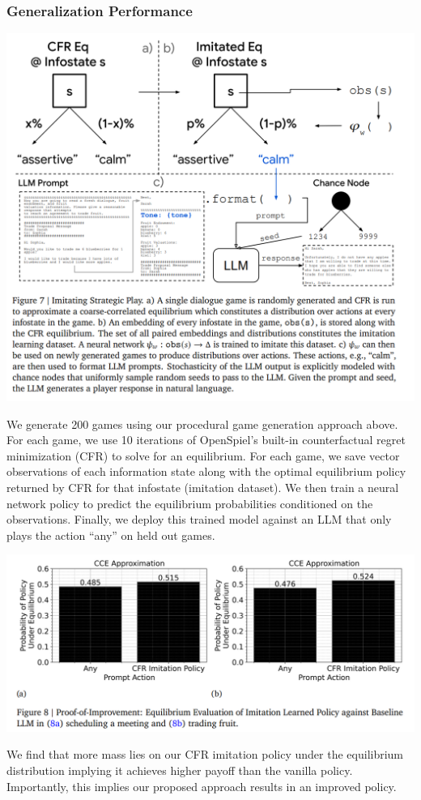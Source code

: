 \documentclass[12pt]{article}
\begin{document}
\subsubsection*{Generalization Performance}
\begin{center}
  \includegraphics*[scale = 0.5]{fig13.png}
\end{center}
We generate 200 games using our procedural game generation approach above. For each game, we use 10 iterations of OpenSpiel's built-in counterfactual
regret minimization (CFR) to solve for an equilibrium.  For each game, we save vector observations of each information state along with the optimal equilibrium policy returned by CFR for that infostate (imitation dataset). We then train a neural network policy to predict the equilibrium probabilities conditioned on the
observations. Finally, we deploy this trained
model against an LLM that only plays the action ``any'' on held out games.
\begin{center}
  \includegraphics*[scale = 0.5]{fig14.png}
\end{center}
We find that more mass lies on our CFR imitation policy under the equilibrium distribution implying it
achieves higher payoff than the vanilla policy. Importantly, this implies our proposed approach results
in an improved policy.
\end{document}

